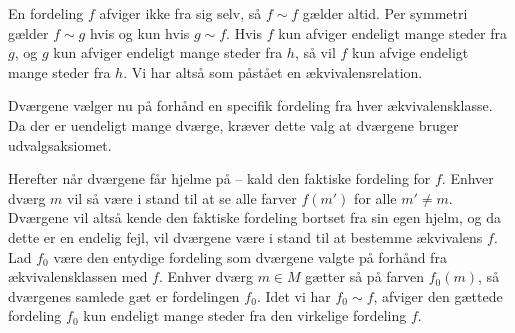 \begin{minipage}[t]{100mm}
En fordeling $f$ afviger ikke fra sig selv, så $f\sim f$ gælder altid. Per symmetri gælder $f\sim g$ hvis og kun hvis $g\sim f$. Hvis $f$ kun afviger endeligt mange steder fra $g$, og $g$ kun afviger endeligt mange steder fra $h$, så vil $f$ kun afvige endeligt mange steder fra $h$. Vi har altså som påstået en ækvivalensrelation.

Dværgene vælger nu på forhånd en specifik fordeling fra hver ækvivalensklasse. Da der er uendeligt mange dværge, kræver dette valg at dværgene bruger udvalgsaksiomet.

Herefter når dværgene får hjelme på -- kald den faktiske fordeling for $f$. Enhver dværg $m$ vil så være i stand til at se alle farver $f(m')$ for alle $m'\neq m$. Dværgene vil altså kende den faktiske fordeling bortset fra sin egen hjelm, og da dette er en endelig fejl, vil dværgene være i stand til at bestemme ækvivalens $f$. Lad $f_0$ være den entydige fordeling som dværgene valgte på forhånd fra ækvivalensklassen med $f$. Enhver dværg $m\in M$ gætter så på farven $f_0(m)$, så dværgenes samlede gæt er fordelingen $f_0$. Idet vi har $f_0\sim f$, afviger den gættede fordeling $f_0$ kun endeligt mange steder fra den virkelige fordeling $f$.


\end{minipage}
